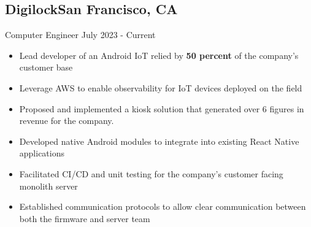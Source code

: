 \documentclass[a4,10pt]{article}
\newcommand{\subtext}[1]{
#1\par\vspace{-0.2cm}}
\newenvironment{zitemize}{
\begin{itemize}\itemsep0pt \parskip0pt \parsep1pt}
{\end{itemize}\vspace{-0.5cm}}
\begin{document}

\subsection*{Digilock\hfill San Francisco, CA} 
\subtext{Computer Engineer \hfill July 2023 - Current} 
    \begin{zitemize}
        \item Lead developer of an Android IoT relied by \textbf{50 percent} of the company's customer base
        \item Leverage AWS to enable observability for IoT devices deployed on the field
        \item Proposed and implemented a kiosk solution that generated over 6 figures in revenue for the company.
        \item Developed native Android modules to integrate into existing React Native applications
        \item Facilitated CI/CD and unit testing for the company's customer facing monolith server
        \item Established communication protocols to allow clear communication between both the firmware and server team


        
    
    \end{zitemize}
\end{document}
